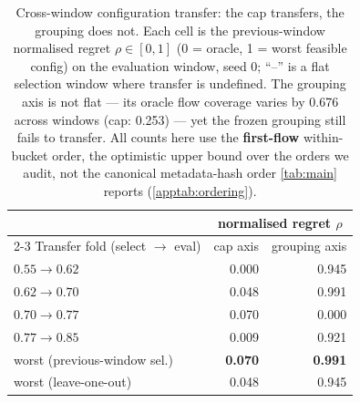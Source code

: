 \begin{table}[t]
\centering
\caption{Cross-window configuration transfer: the cap transfers, the grouping does not.
Each cell is the previous-window normalised regret $\rho\in[0,1]$ (0 = oracle,
1 = worst feasible config) on the evaluation window, seed 0; ``--'' is a flat selection
window where transfer is undefined. The grouping axis is not flat --- its oracle flow
coverage varies by 0.676 across windows (cap: 0.253) ---
yet the frozen grouping still fails to transfer. All counts here use the \textbf{first-flow} within-bucket order, the optimistic upper bound over the orders we audit, not the canonical metadata-hash order \cref{tab:main} reports (\cref{apptab:ordering}).}
\label{apptab:transfer}
\begin{tabular}{lrr}
\toprule
 & \multicolumn{2}{c}{normalised regret $\rho$} \\
\cmidrule(lr){2-3}
Transfer fold (select $\to$ eval) & cap axis & grouping axis \\
\midrule
$0.55 \to 0.62$ & 0.000 & 0.945 \\
$0.62 \to 0.70$ & 0.048 & 0.991 \\
$0.70 \to 0.77$ & 0.070 & 0.000 \\
$0.77 \to 0.85$ & 0.009 & 0.921 \\
\midrule
worst (previous-window sel.)  & \textbf{0.070} & \textbf{0.991} \\
worst (leave-one-out)         & 0.048 & 0.945 \\
\bottomrule
\end{tabular}
\end{table}
